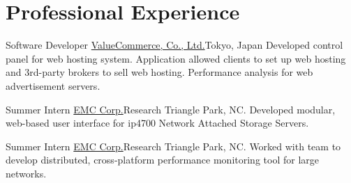 \section{Professional Experience}
		{Software Developer}
		{\href{http://valuecommerce.com}{ValueCommerce, Co., Ltd.}}{Tokyo, Japan}{}
		{Developed control panel for web hosting system.  Application allowed clients to set up web hosting and 3rd-party
		 brokers to sell web hosting.  Performance analysis for web advertisement servers.}

		{Summer Intern}
		{\href{http://www.emc.com}{EMC Corp.}}{Research Triangle Park, NC.}{}
		{Developed modular, web-based user interface for ip4700 Network Attached Storage Servers.}

		{Summer Intern}
		{\href{http://www.emc.com}{EMC Corp.}}{Research Triangle Park, NC.}{}
		{Worked with team to develop distributed, cross-platform performance monitoring tool for large networks.}



